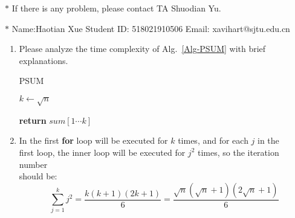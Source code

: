 \documentclass[12pt,a4paper]{article}
\makeatletter
\newtheorem*{solution}{Solution}
\theoremstyle{definition}
\renewenvironment{solution}[1][Solution] {\par\pushQED{\qed}\normalfont\topsep6\p@\@plus6\p@\relax\trivlist\item[\hskip\labelsep\bfseries#1\@addpunct{.}]\ignorespaces}{\popQED\endtrivlist\@endpefalse} \makeatother
\makeatother
\begin{document}
\noindent

\noindent{}
\begin{center}
\footnotesize{\color{red}$*$ If there is any problem, please contact TA Shuodian Yu.}

\footnotesize{\color{blue}$*$ Name:Haotian Xue  \quad Student ID: 518021910506 \quad Email: xavihart@sjtu.edu.cn}
\end{center}

\begin{enumerate}
    \item
    Please analyze the time complexity of Alg.~\ref{Alg-PSUM} with brief explanations.

    \begin{minipage}[t]{0.8\textwidth}
    \begin{algorithm}[H]
        \caption{PSUM}\label{Alg-PSUM}

        \BlankLine

        $k \leftarrow \sqrt{n}$\;


        {\bf return} $sum[1\cdots k]$\;
    \end{algorithm}
    \end{minipage}

    \begin{solution}
      In the first \textbf{for} loop will be executed for $k$ times, and for each $j$ in the \\
 first loop, the inner loop will be executed for $j^2$ times, so
      the iteration number  \\ 
      should be:
      \begin{equation*}
         \sum_{j = 1}^{k}j^2 = \frac{k(k + 1)(2k + 1)}{6} = \frac{\sqrt{n}(\sqrt{n} + 1)(2\sqrt{n} + 1)}{6} 
      \end{equation*}
      

\end{solution}
\end{enumerate}
\end{document}
